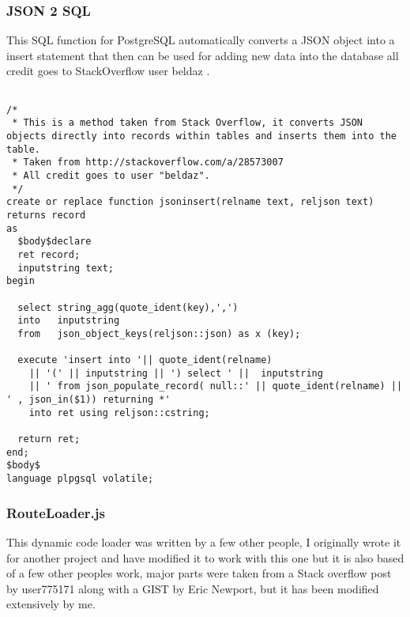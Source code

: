 \subsubsection{JSON 2 SQL}

This SQL function for PostgreSQL automatically converts a JSON object into a insert statement that then can be used for adding new data into the database all credit goes to StackOverflow user beldaz \cite{user2627000:PostgreSQLinsertdataintotablefromjson:2013:online}.

\lstsql
\begin{lstlisting}

/*
 * This is a method taken from Stack Overflow, it converts JSON objects directly into records within tables and inserts them into the table.
 * Taken from http://stackoverflow.com/a/28573007 
 * All credit goes to user "beldaz".
 */
create or replace function jsoninsert(relname text, reljson text) returns record 
as
  $body$declare
  ret record;
  inputstring text;
begin

  select string_agg(quote_ident(key),',') 
  into   inputstring
  from   json_object_keys(reljson::json) as x (key);

  execute 'insert into '|| quote_ident(relname) 
    || '(' || inputstring || ') select ' ||  inputstring 
    || ' from json_populate_record( null::' || quote_ident(relname) || ' , json_in($1)) returning *'
    into ret using reljson::cstring;

  return ret;
end;
$body$
language plpgsql volatile;

\end{lstlisting}

\subsubsection{RouteLoader.js}

This dynamic code loader was written by a few other people, I originally wrote it for another project and have modified it to work with this one but it is also based of a few other peoples work, major parts were taken from a Stack overflow post by user775171 \cite{user775171:LoadingNodejsmodulesdynamicallybasedonroute:2012:online} along with a GIST by Eric Newport\cite{EricNewport:FileWalker:2013:online}, but it has been modified extensively by me.

